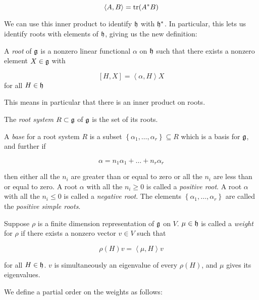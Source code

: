 \begin{equation}
\left<A,B\right> = \operatorname{tr}(A^*B)
\end{equation}

We can use this inner product to identify $\mathfrak{h}$ with $\mathfrak{h}^*$. In
particular, this lets us identify roots with elements of $\mathfrak{h}$, giving us
the new definition:

\begin{defn}
A \emph{root} of $\mathfrak{g}$ is a nonzero linear functional $\alpha$ on $\mathfrak{h}$
such that there exists a nonzero element $X \in \mathfrak{g}$ with 

\begin{equation}
\left[ H,X \right] = \left<\alpha,H\right>X
\end{equation}
for all $H \in \mathfrak{h}$
\end{defn}

This means in particular that there is an inner product on roots. 

The \emph{root system} $R \subset \mathfrak{g}$ of $\mathfrak{g}$ is the set of its roots. 

\begin{defn}
A \emph{base} for a root system $R$ is a subset $\left\{ \alpha_1, \ldots,
\alpha_r \right\} \subseteq R$ which is a basis for $\mathfrak{g}$, and further if 

\begin{equation}
\alpha = n_1 \alpha_1 + \ldots + n_r \alpha_r
\end{equation}

then either all the $n_i$ are greater than or equal to zero or all the $n_i$
are less than or equal to zero. A root $\alpha$ with all the $n_i \geq 0$ is
called a \emph{positive root}. A root $\alpha$ with all the $n_i \leq 0$ is
called a \emph{negative root}. The elements $\left\{ \alpha_1, \ldots, \alpha_r
\right\}$ are called the \emph{positive simple roots}.
\end{defn}

Suppose $\rho$ is a finite dimension representation of $\mathfrak{g}$ on $V$. $\mu \in \mathfrak{h}$ is called a \emph{weight} for $\rho$ if there exists a nonzero vector $v \in V$ such that 

\begin{equation}
\rho(H)v = \left<\mu, H\right> v
\end{equation}

for all $H \in \mathfrak{h}$. $v$ is simultaneously an eigenvalue of every $\rho(H)$,
and $\mu$ gives its eigenvalues.

We define a partial order on the weights as follows:

